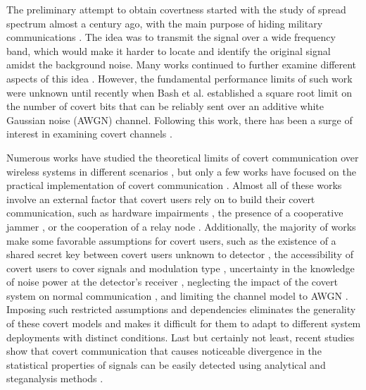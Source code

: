 The preliminary attempt to obtain covertness started with the study of spread spectrum almost a century ago, with the main purpose of hiding military communications \cite{scholtz1982origins}. The idea was to transmit the signal over a wide frequency band, which would make it harder to locate and identify the original signal amidst the background noise. Many works continued to further examine different aspects of this idea \cite{reynders2016chirp, yan2019low}. However, the fundamental performance limits of such work were unknown until recently when Bash et al. \cite{bash2012square, bash2013limits} established a square root limit on the number of covert bits that can be reliably sent over an additive white Gaussian noise (AWGN) channel. Following this work, there has been a surge of interest in examining covert channels \cite{sobers2017covert,soltani2018covert,sheikholeslami2018multi,cao2018wireless}.

Numerous works have studied the theoretical limits of covert communication over wireless systems in different scenarios \cite{bash2012square, soltani2018covert, sheikholeslami2018multi, li2021fundamental}, but only a few works have focused on the practical implementation of covert communication \cite{dutta2012secret, cao2018wireless, liao2020generative, mohammed2021adversarial}. Almost all of these works involve an external factor that covert users rely on to build their covert communication, such as hardware impairments \cite{mohammed2021adversarial}, the presence of a cooperative jammer \cite{sobers2017covert}, or the cooperation of a relay node \cite{liao2020generative, kim2022covert}. Additionally, the majority of works make some favorable assumptions for covert users, such as the existence of a shared secret key between covert users unknown to detector \cite{soltani2018covert}, the accessibility of covert users to cover signals and modulation type \cite{grzesiak2021wireless}, uncertainty in the knowledge of noise power at the detector's receiver \cite{he2017covert}, neglecting the impact of the covert system on normal communication \cite{mohammed2021adversarial}, and limiting the channel model to AWGN \cite{mohammed2021adversarial}. Imposing such restricted assumptions and dependencies eliminates the generality of these covert models and makes it difficult for them to adapt to different system deployments with distinct conditions. Last but certainly not least, recent studies show that covert communication that causes noticeable divergence in the statistical properties of signals can be easily detected using analytical and steganalysis methods \cite{bahramali2021robust,huang2020exploiting}.

